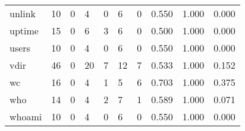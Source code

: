 \begin{longtable}{lp{2.0cm}p{2.0cm}p{2.0cm}p{2.0cm}p{2.0cm}p{2.0cm}p{2.0cm}p{2.0cm}p{2.0cm}}
unlink    &                     10 &                                             0 &                                            4 &                                           0 &                                            6 &                                          0 &                                0.550 &                                  1.000 &                                0.000 \\
uptime    &                     15 &                                             0 &                                            6 &                                           3 &                                            6 &                                          0 &                                0.500 &                                  1.000 &                                0.000 \\
users     &                     10 &                                             0 &                                            4 &                                           0 &                                            6 &                                          0 &                                0.550 &                                  1.000 &                                0.000 \\
vdir      &                     46 &                                             0 &                                           20 &                                           7 &                                           12 &                                          7 &                                0.533 &                                  1.000 &                                0.152 \\
wc        &                     16 &                                             0 &                                            4 &                                           1 &                                            5 &                                          6 &                                0.703 &                                  1.000 &                                0.375 \\
who       &                     14 &                                             0 &                                            4 &                                           2 &                                            7 &                                          1 &                                0.589 &                                  1.000 &                                0.071 \\
whoami    &                     10 &                                             0 &                                            4 &                                           0 &                                            6 &                                          0 &                                0.550 &                                  1.000 &                                0.000 \\

\end{longtable}
